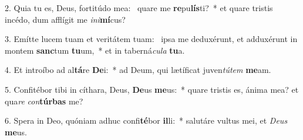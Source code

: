 2. Quia tu es, Deus, fortitúdo mea: \dag\  quare me \textbf{re}pu\textbf{lís}ti?~*  et quare tristis incédo, dum afflígit me \textit{in}\textit{i}\textbf{mí}cus?\

3. Emítte lucem tuam et veritátem tuam: \dag\  ipsa me deduxérunt, et adduxérunt in montem \textbf{sanc}tum \textbf{tu}um,~*  et in taberná\textit{cu}\textit{la} \textbf{tu}a.\

4. Et introíbo ad al\textbf{tá}re \textbf{De}i:~*  ad Deum, qui lætíficat juven\textit{tú}\textit{tem} \textbf{me}am.\

5. Confitébor tibi in cíthara, Deus, \textbf{De}us \textbf{me}us:~*  quare tristis es, ánima mea? et qua\textit{re} \textit{con}\textbf{túr}\textbf{bas} me?\

6. Spera in Deo, quóniam adhuc confi\textbf{té}bor \textbf{il}li:~*  salutáre vultus mei, et \textit{De}\textit{us} \textbf{me}us.\

